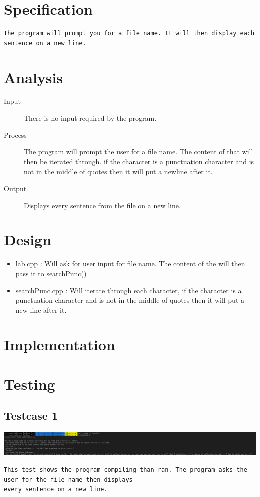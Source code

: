 \documentclass{article}
\begin{document}
\newpage\section*{Specification}
\begin{verbatim}
The program will prompt you for a file name. It will then display each sentence on a new line.
\end{verbatim}


\newpage\section*{Analysis}
\begin{description}
  \item[Input] There is no input required by the program.
  \item[Process] The program will prompt the user for a file name. The content of that will then be iterated through. if the character is a punctuation character and is not in the middle of quotes then it will put a newline after it.
  \item[Output] Displays every sentence from the file on a new line.
\end{description}

\newpage\section*{Design}
\begin{itemize}
	\item lab.cpp : Will ask for user input for file name. The content of the will then pass it to searchPunc()
	\item searchPunc.cpp : Will iterate through each character, if the character is a punctuation character and is not in the middle of quotes then it will put a new line after it.
\end{itemize}

\newpage\section*{Implementation}

\newpage

\newpage

\newpage

\newpage\section*{Testing}
\subsection*{Testcase 1}
\includegraphics[width=450pt]{img/test1.png}
\begin{verbatim}
This test shows the program compiling than ran. The program asks the user for the file name then displays
every sentence on a new line.
\end{verbatim}
\newpage
\end{document}
